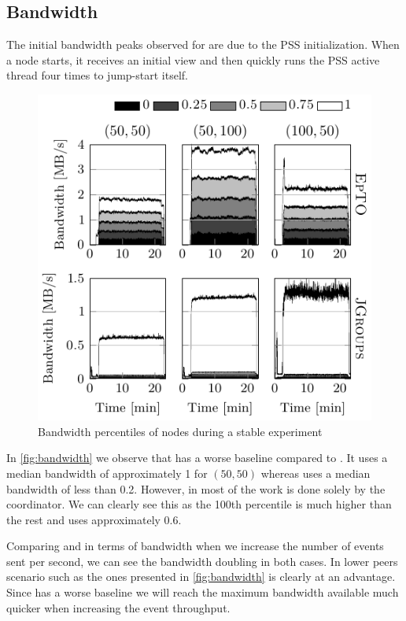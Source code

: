 \subsection{Bandwidth}
The initial bandwidth peaks observed for \epto are due to the PSS initialization. When a node starts, it receives an initial view and then quickly runs the PSS active thread four times to jump-start itself.
 \begin{figure}[hpt]
 	\centering
 	\includegraphics[width=\linewidth]{figures/bandwidth-nochurn.pdf}
 	\vspace{-2mm} 
 	\caption{Bandwidth percentiles of nodes during a stable experiment}
 	\vspace{-2mm} 
 	\label{fig:bandwidth}
 \end{figure}
In \autoref{fig:bandwidth} we observe that \epto has a worse baseline compared to \jgroups. It uses a median bandwidth of approximately \SI{1}{\mbps} for $(50,50)$ whereas \jgroups uses a median bandwidth of less than \SI{0.2}{\mbps}. However, in \jgroups most of the work is done solely by the coordinator. We can clearly see this as the 100th percentile is much higher than the rest and uses approximately \SI{.6}{\mbps}.

Comparing \epto and \jgroups in terms of bandwidth when we increase the number of events sent per second, we can see the bandwidth doubling in both cases. In lower peers scenario such as the ones presented in \autoref{fig:bandwidth} \jgroups is clearly at an advantage. Since \epto has a worse baseline we will reach the maximum bandwidth available much quicker when increasing the event throughput.

